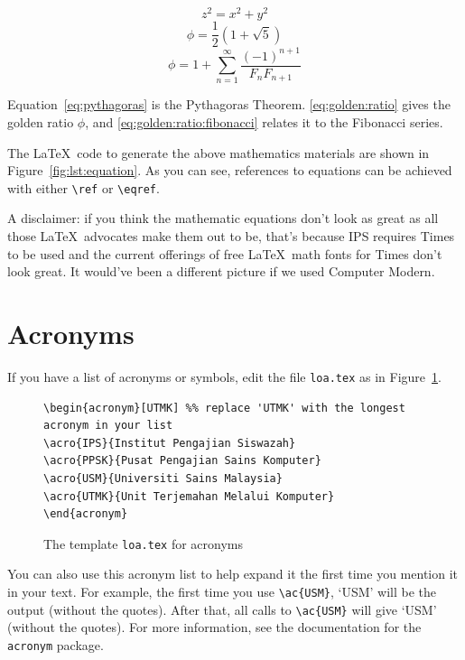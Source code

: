 \begin{equation}\label{eq:pythagoras}
z^2 = x^2 + y^2
\end{equation}
\begin{equation}\label{eq:golden:ratio}
\phi = \frac{1}{2} (1 + \sqrt{5})
\end{equation}
\begin{equation}\label{eq:golden:ratio:fibonacci}
\phi = 1 + \sum ^ {\infty} _ {n=1}
                \frac{ (-1) ^ {n+1} }{ F_n F_{n+1} }
\end{equation}

Equation~\ref{eq:pythagoras} is the Pythagoras Theorem. \eqref{eq:golden:ratio} gives the golden ratio $\phi$, and \eqref{eq:golden:ratio:fibonacci} relates it to the Fibonacci series.

The \LaTeX\ code to generate the above mathematics materials are shown in Figure~\ref{fig:lst:equation}.  As you can see, references to equations can be achieved with either \verb|\ref| or \verb|\eqref|. 

A disclaimer: if you think the mathematic equations don't look as great as all those \LaTeX\ advocates make them out to be, that's because IPS requires Times to be used and the current offerings of free \LaTeX\ math fonts for Times don't look great. It would've been a different picture if we used Computer Modern.

\section{Acronyms}
\acresetall
If you have a list of acronyms or symbols, edit the file \verb|loa.tex| as in Figure~\ref{fig:acronym}.

\begin{figure}[hbt!]
\begin{lstlisting}
\begin{acronym}[UTMK] %% replace 'UTMK' with the longest acronym in your list
\acro{IPS}{Institut Pengajian Siswazah}
\acro{PPSK}{Pusat Pengajian Sains Komputer}
\acro{USM}{Universiti Sains Malaysia}
\acro{UTMK}{Unit Terjemahan Melalui Komputer}
\end{acronym}
\end{lstlisting}
\caption{The template \texttt{loa.tex} for acronyms}\label{fig:acronym}
\end{figure}

You can also use this acronym list to help expand it the first time you mention it in your text.  For example, the first time you use \verb|\ac{USM}|, `\ac{USM}' will be the output (without the quotes).  After that, all calls to \verb|\ac{USM}| will give `\ac{USM}' (without the quotes).  For more information, see the documentation for the \texttt{acronym} package.


